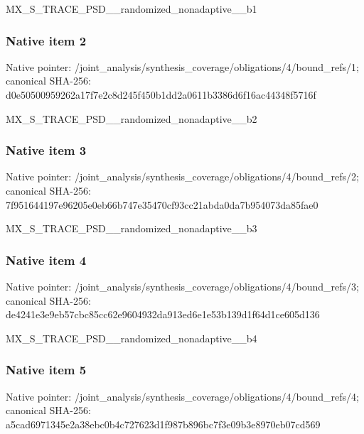 \documentclass[10pt,a4paper]{article}
\begin{document}
\begingroup\raggedright\sloppy MX\_\allowbreak{}S\_\allowbreak{}TRACE\_\allowbreak{}PSD\_\allowbreak{}\_\allowbreak{}randomized\_\allowbreak{}nonadaptive\_\allowbreak{}\_\allowbreak{}b1\par\endgroup

\subsubsection{Native item 2}
Native pointer: /joint\_\allowbreak{}analysis/synthesis\_\allowbreak{}coverage/obligations/4/bound\_\allowbreak{}refs/1; canonical SHA-256: d0e50500959262a17f7e2c8d245f450b1dd2a0611b3386d6f16ac44348f5716f

\begingroup\raggedright\sloppy MX\_\allowbreak{}S\_\allowbreak{}TRACE\_\allowbreak{}PSD\_\allowbreak{}\_\allowbreak{}randomized\_\allowbreak{}nonadaptive\_\allowbreak{}\_\allowbreak{}b2\par\endgroup

\subsubsection{Native item 3}
Native pointer: /joint\_\allowbreak{}analysis/synthesis\_\allowbreak{}coverage/obligations/4/bound\_\allowbreak{}refs/2; canonical SHA-256: 7f951644197e96205e0eb66b747e35470cf93cc21abda0da7b954073da85fae0

\begingroup\raggedright\sloppy MX\_\allowbreak{}S\_\allowbreak{}TRACE\_\allowbreak{}PSD\_\allowbreak{}\_\allowbreak{}randomized\_\allowbreak{}nonadaptive\_\allowbreak{}\_\allowbreak{}b3\par\endgroup

\subsubsection{Native item 4}
Native pointer: /joint\_\allowbreak{}analysis/synthesis\_\allowbreak{}coverage/obligations/4/bound\_\allowbreak{}refs/3; canonical SHA-256: de4241e3e9eb57cbc85cc62e9604932da913ed6e1e53b139d1f64d1ce605d136

\begingroup\raggedright\sloppy MX\_\allowbreak{}S\_\allowbreak{}TRACE\_\allowbreak{}PSD\_\allowbreak{}\_\allowbreak{}randomized\_\allowbreak{}nonadaptive\_\allowbreak{}\_\allowbreak{}b4\par\endgroup

\subsubsection{Native item 5}
Native pointer: /joint\_\allowbreak{}analysis/synthesis\_\allowbreak{}coverage/obligations/4/bound\_\allowbreak{}refs/4; canonical SHA-256: a5cad6971345e2a38ebc0b4c727623d1f987b896bc7f3e09b3e8970eb07cd569
\end{document}
